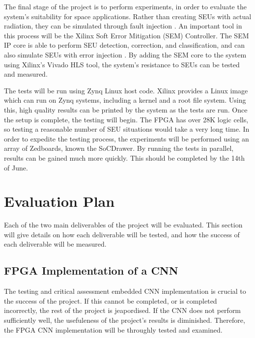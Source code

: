 \documentclass[12pt]{article}
\begin{document}
The final stage of the project is to perform experiments, in order to evaluate the system's suitability for space applications. Rather than creating SEUs with actual radiation, they can be simulated through fault injection \cite{FaultInjection}. An important tool in this process will be the Xilinx Soft Error Mitigation (SEM) Controller. The SEM IP core is able to perform SEU detection, correction, and classification, and can also simulate SEUs with error injection \cite{ManualSEM}. By adding the SEM core to the system using Xilinx's Vivado HLS tool, the system's resistance to SEUs can be tested and measured. 

The tests will be run using Zynq Linux host code. Xilinx provides a Linux image which can run on Zynq systems, including a kernel and a root file system. Using this, high quality results can be printed by the system as the tests are run. Once the setup is complete, the testing will begin. The FPGA has over 28K logic cells, so testing a reasonable number of SEU situations would take a very long time. In order to expedite the testing process, the experiments will be performed using an array of Zedboards, known the SoCDrawer. By running the tests in parallel, results can be gained much more quickly. This should be completed by the 14th of June.

\section{Evaluation Plan}
\label{sec:EvalPlan}
\vspace{-12pt}

Each of the two main deliverables of the project will be evaluated. This section will give details on how each deliverable will be tested, and how the success of each deliverable will be measured.

\subsection{FPGA Implementation of a CNN}
\label{sec:EvalPlan-FPGAImplOfCnn}
\vspace{-12pt}

The testing and critical assessment embedded CNN implementation is crucial to the success of the project. If this cannot be completed, or is completed  incorrectly, the rest of the project is jeapordised. If the CNN does not perform sufficiently well, the usefuleness of the project's results is diminished. Therefore, the FPGA CNN implementation will be throughly tested and examined.
\end{document}
